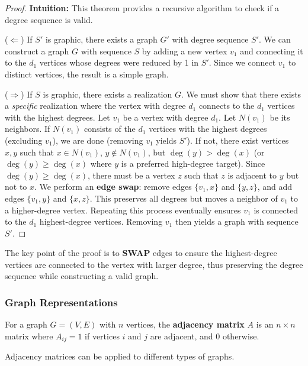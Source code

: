 \begin{proof}
\textbf{Intuition:} This theorem provides a recursive algorithm to check if a degree sequence is valid.

($\Leftarrow$) If $S'$ is graphic, there exists a graph $G'$ with degree sequence $S'$. We can construct a graph $G$ with sequence $S$ by adding a new vertex $v_1$ and connecting it to the $d_1$ vertices whose degrees were reduced by 1 in $S'$. Since we connect $v_1$ to distinct vertices, the result is a simple graph.

($\Rightarrow$) If $S$ is graphic, there exists a realization $G$. We must show that there exists a \textit{specific} realization where the vertex with degree $d_1$ connects to the $d_1$ vertices with the highest degrees.
Let $v_1$ be a vertex with degree $d_1$. Let $N(v_1)$ be its neighbors. If $N(v_1)$ consists of the $d_1$ vertices with the highest degrees (excluding $v_1$), we are done (removing $v_1$ yields $S'$).
If not, there exist vertices $x, y$ such that $x \in N(v_1)$, $y \notin N(v_1)$, but $\deg(y) > \deg(x)$ (or $\deg(y) \ge \deg(x)$ where $y$ is a preferred high-degree target).
Since $\deg(y) \ge \deg(x)$, there must be a vertex $z$ such that $z$ is adjacent to $y$ but not to $x$.
We perform an \textbf{edge swap}: remove edges $\{v_1, x\}$ and $\{y, z\}$, and add edges $\{v_1, y\}$ and $\{x, z\}$.
This preserves all degrees but moves a neighbor of $v_1$ to a higher-degree vertex. Repeating this process eventually ensures $v_1$ is connected to the $d_1$ highest-degree vertices. Removing $v_1$ then yields a graph with sequence $S'$.
\end{proof}

The key point of the proof is to \textbf{SWAP} edges to ensure the highest-degree vertices are connected to the vertex with larger degree, thus preserving the degree sequence while constructing a valid graph.

\subsubsection{Graph Representations}

\begin{definition}
For a graph $G = (V, E)$ with $n$ vertices, the \textbf{adjacency matrix} $A$ is an $n \times n$ matrix where $A_{ij} = 1$ if vertices $i$ and $j$ are adjacent, and $0$ otherwise.
\end{definition}

Adjacency matrices can be applied to different types of graphs.

